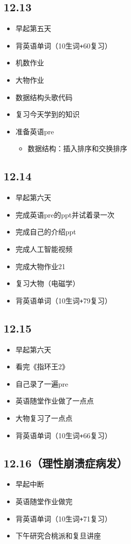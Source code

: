 \documentclass[UTF8]{ctexart}
\begin{document}
\subsection*{12.13}
\begin{itemize}
    \item 早起第五天
    \item 背英语单词（10生词\verb|+|60复习）
    \item 机数作业
    \item 大物作业
    \item 数据结构头歌代码
    \item 复习今天学到的知识
    \item 准备英语pre
          \begin{itemize}
              \item 数据结构：插入排序和交换排序
          \end{itemize}
\end{itemize}
\subsection*{12.14}
\begin{itemize}
    \item 早起第六天
    \item 完成英语pre的ppt并试着录一次
    \item 完成自己的介绍ppt
    \item 完成人工智能视频
    \item 完成大物作业21
    \item 复习大物（电磁学）
    \item 背英语单词（10生词\verb|+|79复习）
\end{itemize}
\subsection*{12.15}
\begin{itemize}
    \item 早起第六天
    \item 看完《指环王2》
    \item 自己录了一遍pre
    \item 英语随堂作业做了一点点
    \item 大物复习了一点点
    \item 背英语单词（10生词\verb|+|66复习）
\end{itemize}
\subsection*{12.16（理性崩溃症病发）}
\begin{itemize}
    \item 早起中断
    \item 英语随堂作业做完
    \item 背英语单词（10生词\verb|+|71复习）
    \item 下午研究合桃派和复旦讲座
\end{itemize}
\end{document}

